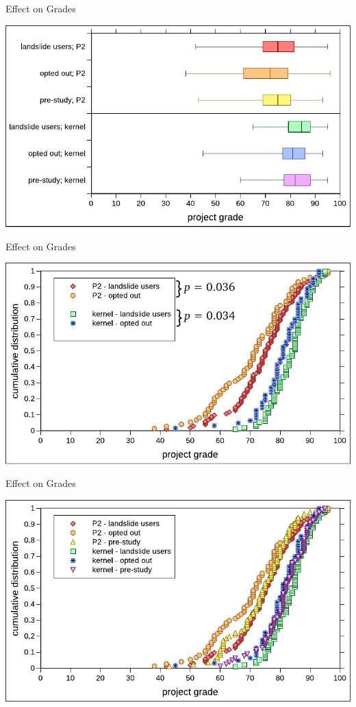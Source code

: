 \documentclass[xcolor=dvipsnames]{beamer}
\begin{document}
\begin{frame}{Effect on Grades}
	\begin{center}
		\includegraphics[width=\textwidth]{../photo-of-ze-studence.pdf}
	\end{center}
\end{frame}

\begin{frame}{Effect on Grades}
	\begin{center}
		\includegraphics[width=\textwidth]{photo-of-ze-studence-cdf-no-pre-study.pdf}
	\end{center}
\end{frame}

\begin{frame}{Effect on Grades}
	\begin{center}
		\includegraphics[width=\textwidth]{../photo-of-ze-studence-cdf.pdf}
	\end{center}
\end{frame}
\end{document}
